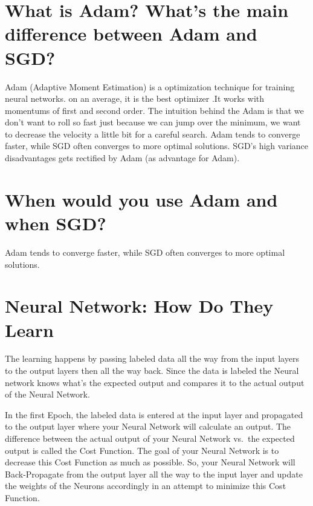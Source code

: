 \documentclass[
]{book}
\begin{document}
\hypertarget{what-is-adam-whats-the-main-difference-between-adam-and-sgd}{%
\section{What is Adam? What's the main difference between Adam and SGD?}\label{what-is-adam-whats-the-main-difference-between-adam-and-sgd}}

Adam (Adaptive Moment Estimation) is a optimization technique for training neural networks. on an average, it is the best optimizer .It works with momentums of first and second order. The intuition behind the Adam is that we don't want to roll so fast just because we can jump over the minimum, we want to decrease the velocity a little bit for a careful search.
Adam tends to converge faster, while SGD often converges to more optimal solutions. SGD's high variance disadvantages gets rectified by Adam (as advantage for Adam).

\hypertarget{when-would-you-use-adam-and-when-sgd}{%
\section{When would you use Adam and when SGD?}\label{when-would-you-use-adam-and-when-sgd}}

Adam tends to converge faster, while SGD often converges to more optimal solutions.

\hypertarget{neural-network-how-do-they-learn}{%
\section{Neural Network: How Do They Learn}\label{neural-network-how-do-they-learn}}

The learning happens by passing labeled data all the way from the input layers to the output layers then all the way back. Since the data is labeled the Neural network knows what's the expected output and compares it to the actual output of the Neural Network.

In the first Epoch, the labeled data is entered at the input layer and propagated to the output layer where your Neural Network will calculate an output. The difference between the actual output of your Neural Network vs.~the expected output is called the Cost Function. The goal of your Neural Network is to decrease this Cost Function as much as possible. So, your Neural Network will Back-Propagate from the output layer all the way to the input layer and update the weights of the Neurons accordingly in an attempt to minimize this Cost Function.
\end{document}
